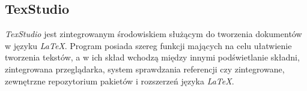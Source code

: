 \subsection{TexStudio}
\textit{TexStudio} jest zintegrowanym środowiskiem służącym do tworzenia dokumentów w języku \textit{LaTeX}. Program posiada szereg funkcji mających na celu ułatwienie tworzenia tekstów, a w ich skład wchodzą między innymi podświetlanie składni, zintegrowana przeglądarka, system sprawdzania referencji czy zintegrowane, zewnętrzne repozytorium pakietów i rozszerzeń języka \textit{LaTeX}.